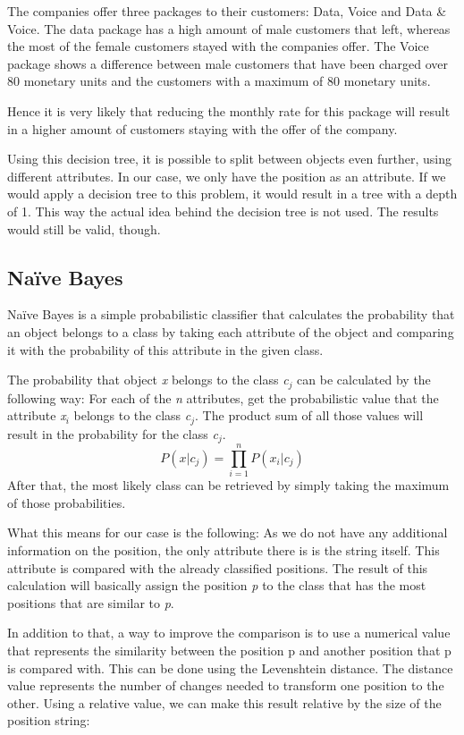 The companies offer three packages to their customers: Data, Voice and Data \& Voice. The data package has a high amount of male customers that left, whereas the most of the female customers stayed with the companies offer. The Voice package shows a difference between male customers that have been charged over 80 monetary units and the customers with a maximum of 80 monetary units.

Hence it is very likely that reducing the monthly rate for this package will result in a higher amount of customers staying with the offer of the company.

Using this decision tree, it is possible to split between objects even further, using different attributes. In our case, we only have the position as an attribute. If we would apply a decision tree to this problem, it would result in a tree with a depth of 1. This way the actual idea behind the decision tree is not used. The results would still be valid, though.

\subsection{Na{\"i}ve Bayes}
\label{sec4.2.3}
Na{\"i}ve Bayes is a simple probabilistic classifier that calculates the probability that an object belongs to a class by taking each attribute of the object and comparing it with the probability of this attribute in the given class.

The probability that object \emph{x} belongs to the class \emph{c$_j$} can be calculated by the following way: For each of the \emph{n} attributes, get the probabilistic value that the attribute \emph{x$_i$} belongs to the class \emph{c$_j$}. The product sum of all those values will result in the probability for the class \emph{c$_j$}.
\[
P(x|c_j) = \prod\limits_{i=1}^n P(x_i|c_j)
\]
After that, the most likely class can be retrieved by simply taking the maximum of those probabilities.

What this means for our case is the following: As we do not have any additional information on the position, the only attribute there is is the string itself. This attribute is compared with the already classified positions. The result of this calculation will basically assign the position \emph{p} to the class that has the most positions that are similar to \emph{p}.

In addition to that, a way to improve the comparison is to use a numerical value that represents the similarity between the position p and another position that p is compared with. This can be done using the Levenshtein distance. The distance value represents the number of changes needed to transform one position to the other. Using a relative value, we can make this result relative by the size of the position string:

